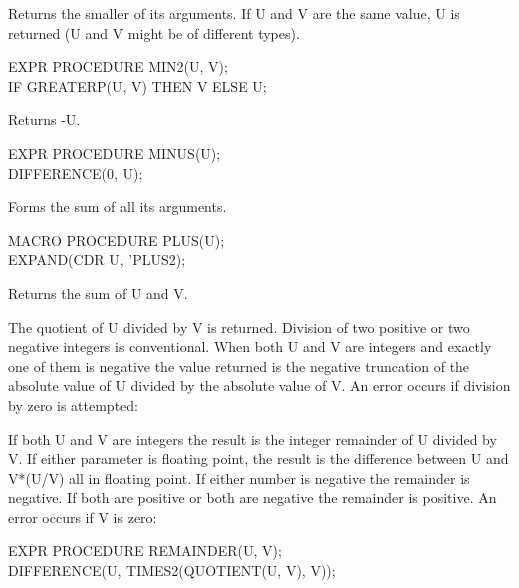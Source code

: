 \documentclass[11pt,letterpaper]{book}
\begin{document}
{Returns the smaller of its arguments. If U and V are the same value,
U is returned (U and V might be of different types).

{\tt \begin{tabbing} EXPR PROCEDURE MIN2(U, V); \\
\hspace*{1em} IF GREATERP(U, V) THEN V ELSE U;
\end{tabbing}}}


{Returns -U.

{\tt \begin{tabbing} EXPR PROCEDURE MINUS(U); \\
\hspace*{1em} DIFFERENCE(0, U);
\end{tabbing}}}


{Forms the sum of all its arguments.

{\tt \begin{tabbing} MACRO PROCEDURE PLUS(U); \\
\hspace*{1em} EXPAND(CDR U, 'PLUS2);
\end{tabbing}}}

{Returns the sum of U and V.}


{The quotient of U divided by V is returned. Division of two positive
or two negative integers is conventional. When both U and V are
integers and exactly one of them is negative the value returned is the
negative truncation of the absolute value of U divided by the absolute
value of V. An error occurs if division by zero is attempted:

}

{If both U and V are integers the result is the integer remainder of U
divided by V. If either parameter is floating point, the result is the
difference between U and V*(U/V) all in floating point. If either
number is negative the remainder is negative. If both are positive or
both are negative the remainder is positive. An error occurs if V is
zero: 


{\tt \begin{tabbing} EXPR PROCEDURE REMAINDER(U, V); \\
\hspace*{1em} DIFFERENCE(U, TIMES2(QUOTIENT(U, V), V));
\end{tabbing}}}
\end{document}
